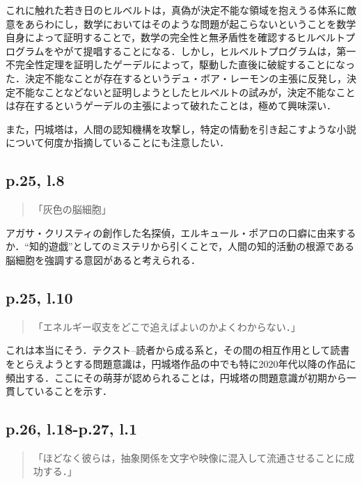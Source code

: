 \documentclass[10pt, a5paper, twoside]{jsarticle}
\theoremstyle{definition}
\begin{document}
			これに触れた若き日のヒルベルトは，真偽が決定不能な領域を抱えうる体系に敵意をあらわにし，数学においてはそのような問題が起こらないということを数学自身によって証明することで，数学の完全性と無矛盾性を確認するヒルベルトプログラムをやがて提唱することになる．しかし，ヒルベルトプログラムは，第一不完全性定理を証明したゲーデルによって，駆動した直後に破綻することになった．決定不能なことが存在するというデュ・ボア・レーモンの主張に反発し，決定不能なことなどないと証明しようとしたヒルベルトの試みが，決定不能なことは存在するというゲーデルの主張によって破れたことは，極めて興味深い．

			また，円城塔は，人間の認知機構を攻撃し，特定の情動を引き起こすような小説について何度か指摘している\cite{kbd,eql}ことにも注意したい．

		\subsection{p.25, l.8}

			\begin{quote}
				
				「灰色の脳細胞」

			\end{quote}

			アガサ・クリスティの創作した名探偵，エルキュール・ポアロの口癖に由来するか．“知的遊戯”としてのミステリから引くことで，人間の知的活動の根源である脳細胞を強調する意図があると考えられる．

		\subsection{p.25, l.10}

			\begin{quote}
				
				「エネルギー収支をどこで追えばよいのかよくわからない．」

			\end{quote}

			これは本当にそう．テクスト--読者から成る系と，その間の相互作用として読書をとらえようとする問題意識は，円城塔作品の中でも特に2020年代以降の作品に頻出する．ここにその萌芽が認められることは，円城塔の問題意識が初期から一貫していることを示す．

		\subsection{p.26, l.18-p.27, l.1}

			\begin{quote}
				
				「ほどなく彼らは，抽象関係を文字や映像に混入して流通させることに成功する．」

			\end{quote}
\end{document}
